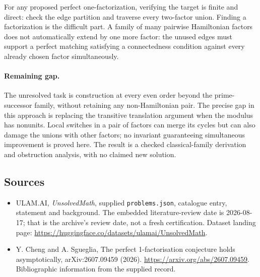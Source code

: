 \documentclass[11pt,a4paper]{article}
\begin{document}
For any proposed perfect one-factorization, verifying the target is finite and direct: check the edge partition and traverse every two-factor union. Finding a factorization is the difficult part. A family of many pairwise Hamiltonian factors does not automatically extend by one more factor: the unused edges must support a perfect matching satisfying a connectedness condition against every already chosen factor simultaneously.

\paragraph{Remaining gap.}
The unresolved task is construction at every even order beyond the prime-successor family, without retaining any non-Hamiltonian pair. The precise gap in this approach is replacing the transitive translation argument when the modulus has nonunits. Local switches in a pair of factors can merge its cycles but can also damage the unions with other factors; no invariant guaranteeing simultaneous improvement is proved here. The result is a checked classical-family derivation and obstruction analysis, with no claimed new solution.

\subsection{Sources}

{\small

\begin{itemize}

\item[\hypertarget{source:statement:1}{S1}] ULAM.AI, \emph{UnsolvedMath}, supplied \texttt{problems.json}, catalogue entry, statement and background. The embedded literature-review date is 2026-08-17; that is the archive’s review date, not a fresh certification. Dataset landing page: \url{https://huggingface.co/datasets/ulamai/UnsolvedMath}.

\item[\hypertarget{source:statement:2}{S2}] Y. Cheng and A. Sgueglia, The perfect 1-factorisation conjecture holds asymptotically, arXiv:2607.09459 (2026). \url{https://arxiv.org/abs/2607.09459}. Bibliographic information from the supplied record.

\end{itemize}

}

\label{end:statement}
\end{document}
